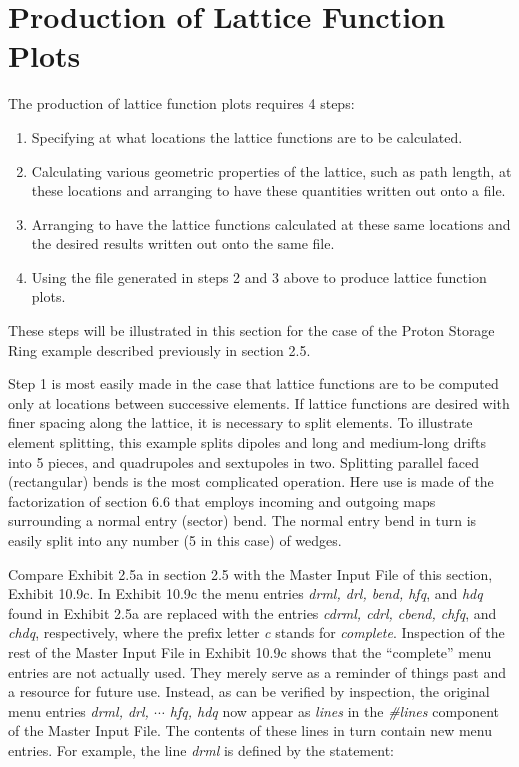 \section{Production of Lattice Function Plots} 
\label{prodlatt}
The production of lattice function plots requires 4 steps:
\begin{enumerate}
\item Specifying at what locations the lattice functions are to be
calculated.
\item Calculating various geometric properties of the lattice, such as
path length, at these locations and arranging to have these quantities
written out onto a file.
\item Arranging to have the lattice functions calculated at these
same locations and the desired results written out onto the same file.
\item Using the file generated in steps 2 and 3 above to
produce lattice function plots.
\end{enumerate}
These steps will be illustrated in this section for the case of the
Proton Storage Ring example described previously in section 2.5.

Step 1 is most easily made in the case that lattice functions are to be
computed only at locations between successive elements.  If lattice
functions are desired with finer spacing along the lattice, it is
necessary to split elements.  To illustrate element splitting, this
example splits dipoles and long and medium-long drifts into 5 pieces, and
quadrupoles and sextupoles in two.  Splitting parallel faced
(rectangular) bends is the most complicated operation.  Here use is made
of the factorization of section 6.6 that employs incoming and outgoing maps
surrounding a normal entry (sector) bend.  The normal entry bend in turn
is easily split into any number (5 in this case) of wedges.  

Compare Exhibit 2.5a in section 2.5 with the Master Input File of this
section, Exhibit 10.9c.  In Exhibit 10.9c the menu entries {\em drml,
drl, bend, hfq}, and {\em hdq} found in Exhibit 2.5a are replaced with
the entries {\em cdrml, cdrl, cbend, chfq}, and {\em chdq}, respectively,
where the prefix letter {\em c} stands for {\em complete}.  Inspection of the
rest of the Master Input File in Exhibit 10.9c shows that the
``complete'' menu entries are not actually used.  They merely serve as a
reminder of things past and a resource for future use.  Instead, as can
be verified by inspection, the original menu entries {\em drml, drl,
$\cdots$ hfq, hdq} now appear as {\em lines} in the {\em \#lines}
component of the Master Input File.  The contents of these lines in turn
contain new menu entries.  For example, the line {\em drml} is defined by
the statement:

